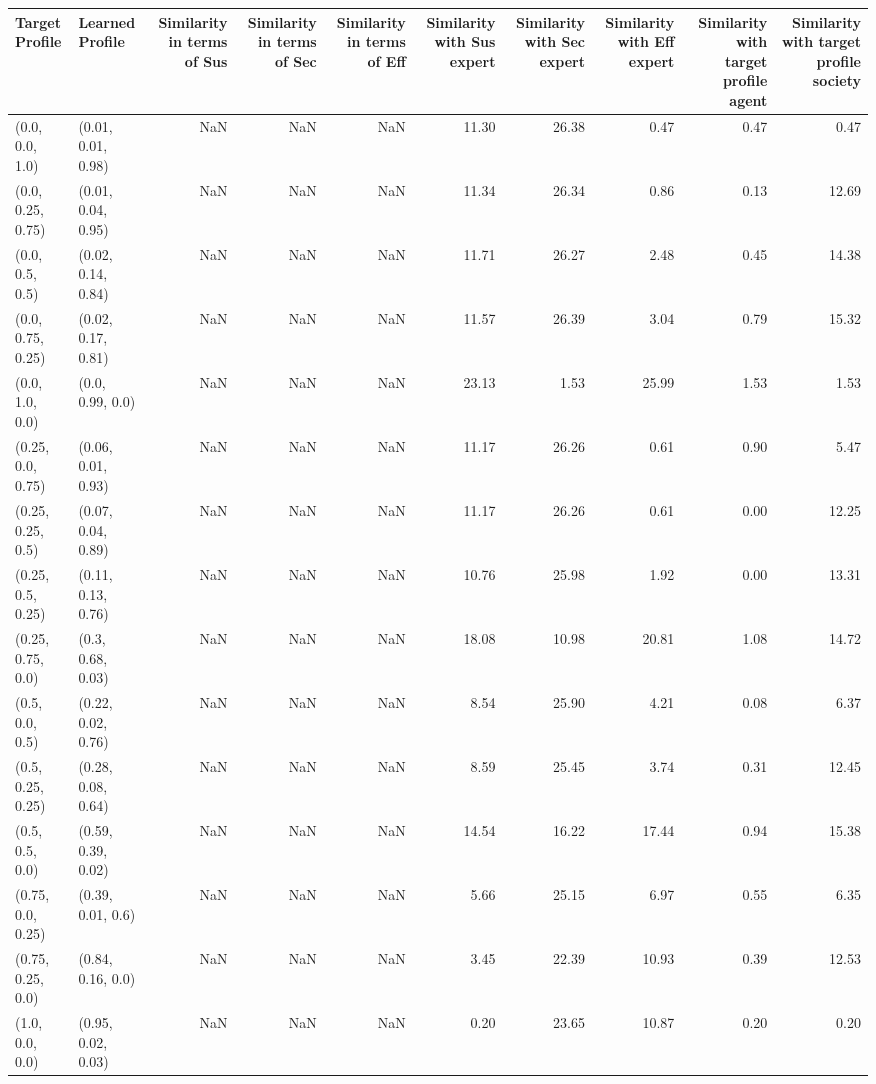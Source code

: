 \begin{tabular}{llrrrrrrrr}
\toprule
Target Profile & Learned Profile & Similarity in terms of Sus & Similarity in terms of Sec & Similarity in terms of Eff & Similarity with Sus expert & Similarity with Sec expert & Similarity with Eff expert & Similarity with target profile agent & Similarity with target profile society \\
\midrule
(0.0, 0.0, 1.0) & (0.01, 0.01, 0.98) & NaN & NaN & NaN & 11.30 & 26.38 & 0.47 & 0.47 & 0.47 \\
(0.0, 0.25, 0.75) & (0.01, 0.04, 0.95) & NaN & NaN & NaN & 11.34 & 26.34 & 0.86 & 0.13 & 12.69 \\
(0.0, 0.5, 0.5) & (0.02, 0.14, 0.84) & NaN & NaN & NaN & 11.71 & 26.27 & 2.48 & 0.45 & 14.38 \\
(0.0, 0.75, 0.25) & (0.02, 0.17, 0.81) & NaN & NaN & NaN & 11.57 & 26.39 & 3.04 & 0.79 & 15.32 \\
(0.0, 1.0, 0.0) & (0.0, 0.99, 0.0) & NaN & NaN & NaN & 23.13 & 1.53 & 25.99 & 1.53 & 1.53 \\
(0.25, 0.0, 0.75) & (0.06, 0.01, 0.93) & NaN & NaN & NaN & 11.17 & 26.26 & 0.61 & 0.90 & 5.47 \\
(0.25, 0.25, 0.5) & (0.07, 0.04, 0.89) & NaN & NaN & NaN & 11.17 & 26.26 & 0.61 & 0.00 & 12.25 \\
(0.25, 0.5, 0.25) & (0.11, 0.13, 0.76) & NaN & NaN & NaN & 10.76 & 25.98 & 1.92 & 0.00 & 13.31 \\
(0.25, 0.75, 0.0) & (0.3, 0.68, 0.03) & NaN & NaN & NaN & 18.08 & 10.98 & 20.81 & 1.08 & 14.72 \\
(0.5, 0.0, 0.5) & (0.22, 0.02, 0.76) & NaN & NaN & NaN & 8.54 & 25.90 & 4.21 & 0.08 & 6.37 \\
(0.5, 0.25, 0.25) & (0.28, 0.08, 0.64) & NaN & NaN & NaN & 8.59 & 25.45 & 3.74 & 0.31 & 12.45 \\
(0.5, 0.5, 0.0) & (0.59, 0.39, 0.02) & NaN & NaN & NaN & 14.54 & 16.22 & 17.44 & 0.94 & 15.38 \\
(0.75, 0.0, 0.25) & (0.39, 0.01, 0.6) & NaN & NaN & NaN & 5.66 & 25.15 & 6.97 & 0.55 & 6.35 \\
(0.75, 0.25, 0.0) & (0.84, 0.16, 0.0) & NaN & NaN & NaN & 3.45 & 22.39 & 10.93 & 0.39 & 12.53 \\
(1.0, 0.0, 0.0) & (0.95, 0.02, 0.03) & NaN & NaN & NaN & 0.20 & 23.65 & 10.87 & 0.20 & 0.20 \\
\bottomrule
\end{tabular}
